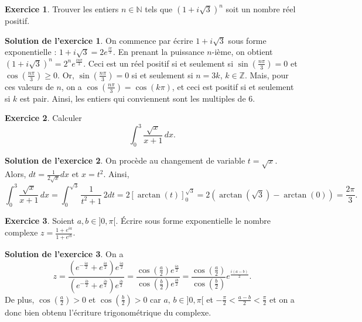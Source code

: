 \documentclass[a4paper, 11pt,openany]{article}%
\theoremstyle{plain}
\theoremstyle{definition}
\newtheorem{exo}{Exercice}
\newtheorem{sol}{Solution de l'exercice}
\theoremstyle{remark}
\newcommand{\Z}{\mathbb{Z}}
\newcommand{\N}{\mathbb{N}}
\begin{document}
\begin{exo}
Trouver les entiers $n \in \N$ tels que $(1+i\sqrt{3})^n$ soit un nombre réel positif.
\end{exo}

\begin{sol}
On commence par écrire $1+i\sqrt{3}$ sous forme exponentielle : $1+i\sqrt{3}=2e^{\frac{i \pi }{3}}$. En prenant la puissance $n$-ième, on obtient $(1+i\sqrt{3})^n =2^n e^{\frac{in\pi}{3}}$. Ceci est un réel positif si et seulement si $\sin\left( \frac{n \pi}{3} \right) =0$ et $\cos \left( \frac{n \pi}{3} \right) \geqslant 0$. Or, $\sin\left( \frac{n \pi}{3} \right)=0$ si et seulement si $n=3k$, $k \in \Z$. Mais, pour ces valeurs de $n$, on a $\cos \left( \frac{n \pi}{3} \right)=\cos(k\pi)$, et ceci est positif si et seulement si $k$ est pair. Ainsi, les entiers qui conviennent sont les multiples de 6.
\end{sol}


\begin{exo}
Calculer
\[ \int_0^3 \frac{\sqrt{x}}{x +1} \, dx.\]
\end{exo}

\begin{sol}
On procède au changement de variable $t = \sqrt{x}$. Alors, $dt = \frac{1}{2\sqrt{x}} dx$ et $x = t^2$. Ainsi,
\[ \int_0^3 \frac{\sqrt{x}}{x +1} \, dx = 
\int_{0}^{\sqrt{3}} \frac{1}{t^2 + 1} \, 2 dt =  2 [ \arctan(t)]_{0}^{\sqrt{3}} = 2(\arctan(\sqrt{3}) - \arctan(0) ) = \frac{2\pi}{3}.\]
\end{sol}



\begin{exo}
Soient $a,b \in ]0, \pi[$. Écrire sous forme exponentielle le nombre complexe $z = \frac{1+e^{ia}}{1+e^{ib}}$.
\end{exo}


\begin{sol}
On a
\[ z = \frac{(e^{-\frac{ia}{2}}+ e^{\frac{ia}{2}})e^{\frac{ia}{2}}}{(e^{-\frac{ib}{2}}+ e^{\frac{ib}{2}})e^{\frac{ib}{2}}} = \frac{\cos \left( \frac{a}{2} \right)e^{\frac{ia}{2}}}{\cos \left( \frac{b}{2} \right)e^{\frac{ib}{2}}} = \frac{\cos \left( \frac{a}{2} \right)}{\cos \left( \frac{b}{2} \right)} e^{\frac{i(a-b)}{2}}.\]
De plus, $\cos\left( \frac{a}{2} \right)>0$ et $\cos\left( \frac{b}{2} \right)>0$ car $a,\, b \in ]0, \pi [$ et $- \frac{\pi}{2} < \frac{a-b}{2} < \frac{\pi}{2}$ et on a donc bien obtenu l'écriture trigonométrique du complexe.
\end{sol}
\end{document}

